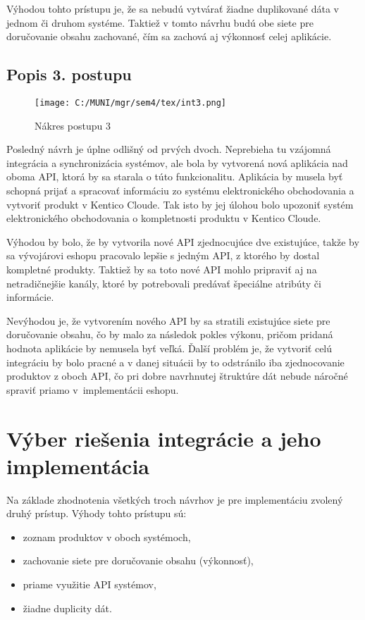 \documentclass[
  printed, %
  table,   %
  lof,     %
  nolot,     %
  twoside,  
]{fithesis3}
\begin{document}
Výhodou tohto prístupu je, že sa nebudú vytvárať žiadne duplikované dáta v jednom či druhom systéme. Taktiež v tomto návrhu budú obe siete pre doručovanie obsahu zachované, čím sa zachová aj výkonnosť celej aplikácie.


\subsection{Popis 3. postupu}
\begin{figure}[h]
  \begin{center}
        \texttt{[image: C:/MUNI/mgr/sem4/tex/int3.png]}
  \end{center}
  \caption{Nákres postupu 3}
  \label{fig:integration3}
\end{figure}
Posledný návrh je úplne odlišný od prvých dvoch. Neprebieha tu vzájomná integrácia a synchronizácia systémov, ale bola by vytvorená nová aplikácia nad oboma API, ktorá by sa starala o túto funkcionalitu. Aplikácia by musela byť schopná prijať a spracovať informáciu zo systému elektronického obchodovania a vytvoriť produkt v Kentico Cloude. Tak isto by jej úlohou bolo upozoniť systém elektronického obchodovania o kompletnosti produktu v Kentico Cloude.

Výhodou by bolo, že by vytvorila nové API zjednocujúce dve existujúce, takže by sa vývojárovi eshopu pracovalo lepšie s jedným API, z ktorého by dostal kompletné produkty. Taktiež by sa toto nové API mohlo pripraviť aj na netradičnejšie kanály, ktoré by potrebovali predávať špeciálne atribúty či informácie. 

Nevýhodou je, že vytvorením nového API by sa stratili existujúce siete pre doručovanie obsahu, čo by malo za následok pokles výkonu, pričom pridaná hodnota aplikácie by nemusela byť veľká. Ďalší problém je, že vytvoriť celú integráciu by bolo pracné a v danej situácii by to odstránilo iba zjednocovanie produktov z oboch API, čo pri dobre navrhnutej štruktúre dát nebude náročné spraviť priamo v~implementácii eshopu.

\section{Výber riešenia integrácie a jeho implementácia}
Na základe zhodnotenia všetkých troch návrhov je pre implementáciu zvolený druhý prístup. Výhody tohto prístupu sú: 
\begin{itemize}
	\item zoznam produktov v oboch systémoch,
	\item zachovanie siete pre doručovanie obsahu (výkonnosť),
	\item priame využitie API systémov,
	\item žiadne duplicity dát.
\end{itemize}
\end{document}
